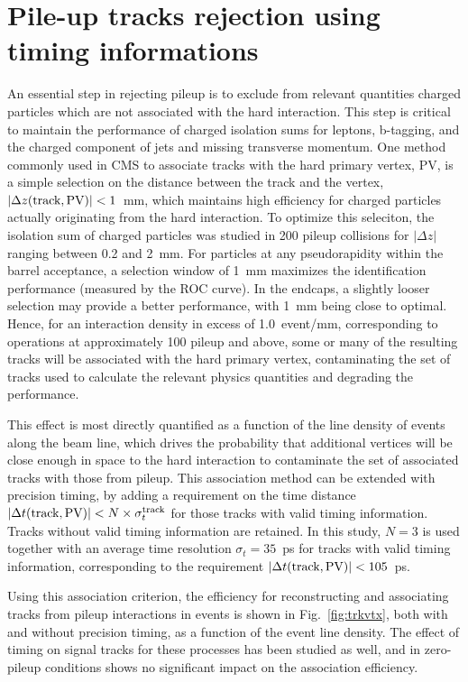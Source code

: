 \section{Pile-up tracks rejection using timing informations}
An essential step in rejecting pileup is to exclude from relevant
quantities charged particles which are not associated with the hard
interaction.  
This step is critical to maintain the performance of charged isolation
sums for leptons, b-tagging, and the charged component of jets and
missing transverse momentum.  
One method commonly used in CMS  to associate tracks with the hard
primary vertex, PV, is a simple selection on the distance between the
track and the vertex, $|\Delta
z(\textnormal{track},\textnormal{PV})|<1$~mm, which maintains 
high efficiency for charged particles actually originating from the
hard interaction. 
To optimize this seleciton, the isolation sum of charged
particles was studied in 200 pileup collisions for $|\Delta z|$
ranging between 0.2 and 2~mm. 
For particles at any pseudorapidity within the barrel acceptance, a
selection window of 1~mm maximizes the identification performance
(measured by the ROC curve).  
In the endcaps, a slightly looser selection may provide a better
performance, with 1~mm being close to optimal. 
Hence, for an interaction density in excess of 1.0~event/mm,
corresponding to operations at approximately 100 pileup and above,
some or many of the resulting tracks will be associated with the 
hard primary vertex, contaminating the set of tracks used to calculate
the relevant physics quantities and degrading the performance.

This effect is most directly quantified as a function of the line
density of events along the beam line, which drives the probability
that additional vertices will be close enough in space to the hard
interaction to contaminate the set of associated tracks with those
from pileup. 
This association method can be extended with precision timing, by
adding a requirement on the time distance $|\Delta
t(\textnormal{track},\textnormal{PV})|<N\times\sigma_t^{\textnormal{track}}$ for those tracks with valid timing information.  Tracks without valid timing information are retained.
In this study,  $N = 3$ is used together with an average time resolution $\sigma_t=35$~ps for tracks with valid timing information, corresponding to the requirement 
$|\Delta t(\textnormal{track},\textnormal{PV})|<105$~ps.

Using this association criterion, the efficiency for reconstructing and
associating tracks from pileup interactions in \ttbar events is
shown in Fig.~\ref{fig:trkvtx}, both with and without precision
timing, as a function of the event line density. The effect of timing
on signal tracks for these processes  has been studied as well, and in
zero-pileup conditions shows no significant impact on the association
efficiency. 

